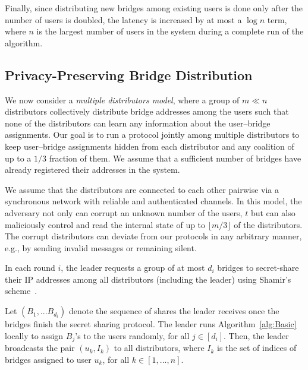 \documentclass[letterpaper,twocolumn,10pt]{article}
\newcommand{\eg}{e.g.}
\begin{document}
Finally, since distributing new bridges among existing users is done only after the number of users is doubled, the latency is increased by at most a $\log{n}$ term, where $n$ is the largest number of users in the system during a complete run of the algorithm.

\subsection{Privacy-Preserving Bridge Distribution} \label{sec:multi-dist}
We now consider a \emph{multiple distributors model}, where a group of \mbox{$m \ll n$} distributors collectively distribute bridge addresses among the users such that none of the distributors can learn any information about the user--bridge assignments. 
Our goal is to run a protocol jointly among multiple distributors to keep user--bridge assignments hidden from each distributor and any coalition of up to a $1/3$ 	fraction of them. We assume that a sufficient number of bridges have already registered their addresses in the system. %

We assume that the distributors are connected to each other pairwise via a synchronous network with reliable and authenticated channels.
In this model, the adversary not only can corrupt an unknown number of the users, $t$ but can also maliciously control and read the internal state of up to $\lfloor m/3 \rfloor$ of the distributors. The corrupt distributors can deviate from our protocols in any arbitrary manner, \eg, by sending invalid messages or remaining silent. 

In each round $i$, the leader requests a group of at most $d_i$ bridges to secret-share their IP addresses among all distributors (including the leader) using Shamir's scheme~\cite{shamir:how}. 

Let $(B_1,...B_{d_i})$ denote the sequence of shares the leader receives once the bridges finish the secret sharing protocol. The leader runs Algorithm~\ref{alg:Basic} locally to assign $B_j$'s to the users randomly, for all ${j \in [d_i]}$. Then, the leader broadcasts the pair $(u_k, I_k)$ to all distributors, where $I_k$ is the set of indices of bridges assigned to user $u_k$, for all $k \in [1,...,n]$.
\end{document}
